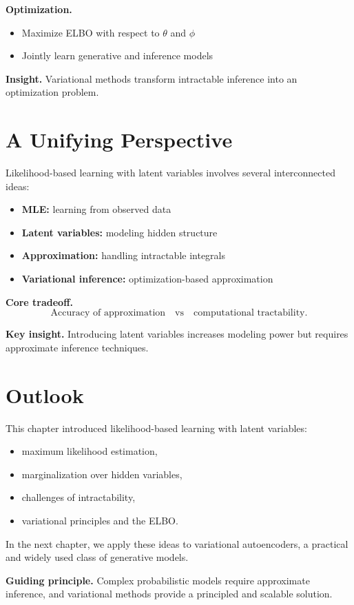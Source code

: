 \medskip

\noindent
\textbf{Optimization.}
\begin{itemize}
    \item Maximize ELBO with respect to $\theta$ and $\phi$
    \item Jointly learn generative and inference models
\end{itemize}

\medskip

\noindent
\textbf{Insight.}  
Variational methods transform intractable inference into an optimization problem.

\section{A Unifying Perspective}

Likelihood-based learning with latent variables involves several interconnected ideas:

\begin{itemize}
    \item \textbf{MLE:} learning from observed data
    \item \textbf{Latent variables:} modeling hidden structure
    \item \textbf{Approximation:} handling intractable integrals
    \item \textbf{Variational inference:} optimization-based approximation
\end{itemize}

\medskip

\noindent
\textbf{Core tradeoff.}
\[
\text{Accuracy of approximation} \quad \text{vs} \quad \text{computational tractability}.
\]

\medskip

\noindent
\textbf{Key insight.}  
Introducing latent variables increases modeling power but requires approximate inference techniques.

\section{Outlook}

This chapter introduced likelihood-based learning with latent variables:
\begin{itemize}
    \item maximum likelihood estimation,
    \item marginalization over hidden variables,
    \item challenges of intractability,
    \item variational principles and the ELBO.
\end{itemize}

\medskip

In the next chapter, we apply these ideas to variational autoencoders, a practical and widely used class of generative models.

\medskip

\noindent
\textbf{Guiding principle.}  
Complex probabilistic models require approximate inference, and variational methods provide a principled and scalable solution.